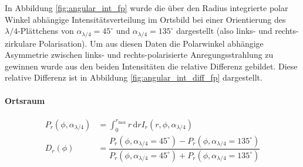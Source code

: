 \documentclass[titlepage,  ngerman]{article}
\begin{document}
		 In Abbildung \ref{fig:angular_int_fp} wurde die über den Radius integrierte polar Winkel abhängige Intensitätsverteilung im Ortsbild bei einer Orientierung des $\lambda / 4$-Plättchens von $\alpha_{\lambda/4} = 45^\circ$ und  $\alpha_{\lambda/4} = 135^\circ$ dargestellt (also links- und rechts-zirkulare Polarisation). Um aus diesen Daten die Polarwinkel abhängige Asymmetrie zwischen links- und rechts-polarisierte Anregungsstrahlung zu gewinnen wurde aus den beiden Intensitäten die relative Differenz gebildet. Diese relative Differenz ist in Abbildung \ref{fig:angular_int_diff_fp} dargestellt.
		\paragraph{Ortsraum}
		\begin{align}
			\label{eq:integration_angular_int}
			P_r(\phi, \alpha_{\lambda/4}) &= \int_{0}^{r_\mathrm{max}}r\,\mathrm{d}r I_r(r, \phi, \alpha_{\lambda /4}) \\
			D_r(\phi) &= \dfrac{P_r(\phi, \alpha_{\lambda/4} = 45^\circ) - P_r(\phi, \alpha_{\lambda/4} = 135^\circ)}{P_r(\phi, \alpha_{\lambda/4} = 45^\circ) + P_r(\phi, \alpha_{\lambda/4} = 135^\circ)}
		\end{align}
\end{document}
